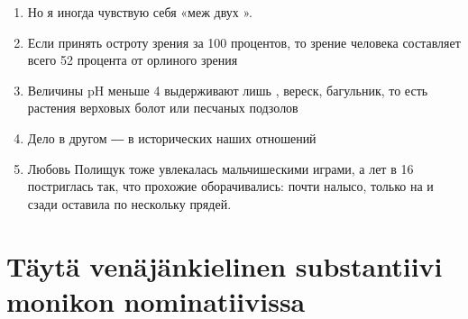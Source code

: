 \documentclass[paper=a4, fontsize=11pt]{scrartcl}
\begin{document}
\begin{enumerate}
    \item Но я иногда чувствую себя «меж двух \raisebox{-0.5cm}{\shortstack{\underline{\hspace{3cm}}\\tuli}} ».
    \item Если принять остроту зрения \raisebox{-0.5cm}{\shortstack{\underline{\hspace{3cm}}\\kotka}}  за 100 процентов, то зрение человека составляет всего 52 процента от орлиного зрения
    \item Величины pH меньше 4 выдерживают лишь  , вереск, багульник, то есть растения верховых болот или песчаных подзолов
    \item Дело в другом ― в исторических \raisebox{-0.5cm}{\shortstack{\underline{\hspace{3cm}}\\juuri}}  наших отношений
    \item Любовь Полищук тоже увлекалась мальчишескими играми, а лет в 16 постриглась так, что прохожие оборачивались: почти налысо, только на   и сзади оставила по нескольку прядей.
\end{enumerate}


\clearpage

\section{Täytä venäjänkielinen substantiivi monikon nominatiivissa}
\end{document}
